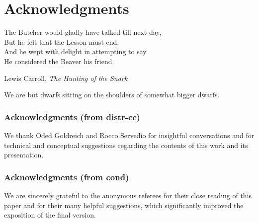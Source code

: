 \cleartorecto %
\chapter{Acknowledgments} %
\thispagestyle{plain} %

\epigraph{The Butcher would gladly have talked till next day,\\
But he felt that the Lesson must end,\\
And he wept with delight in attempting to say\\
He considered the Beaver his friend.}{Lewis Carroll, \textit{The Hunting of the Snark}}

We are but dwarfs sitting on the shoulders of somewhat bigger dwarfs.


\subsection{Acknowledgments (from distr-cc)}
We thank Oded Goldreich and Rocco Servedio for insightful conversations and for technical and conceptual suggestions regarding the contents of this work and its presentation.

\subsection{Acknowledgments (from cond)}
We are sincerely grateful to the anonymous referees for their close reading of this paper
and for their many helpful suggestions, which significantly improved the exposition of the
final version.
